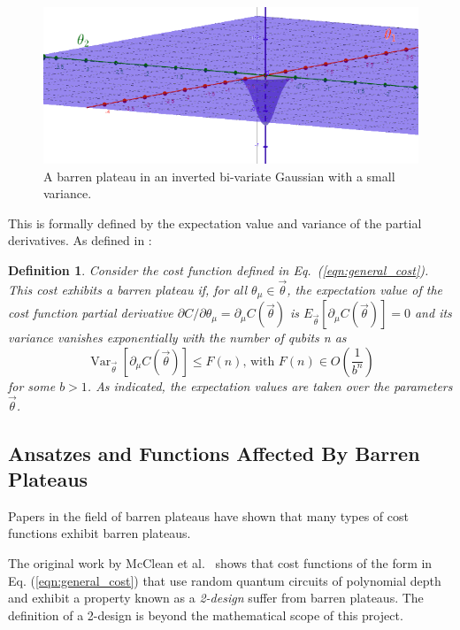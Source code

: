 \documentclass[a4paper,12pt]{article}
\newcommand{\thetas}{\vec{\theta}}
\newcommand{\del}{\partial}
\DeclareMathOperator{\Var}{Var}
\newtheorem{definition}{Definition}
\begin{document}
\begin{figure}[h]
    \centering
    \captionsetup{justification=centering, margin=0.5cm}
    \includegraphics[scale=0.5]{bp_3d.png}
    \caption{A barren plateau in an inverted bi-variate Gaussian with a small variance.}
    \label{fig:bp}
\end{figure}

This is formally defined by the expectation value and variance of the partial derivatives.
As defined in \cite{arrasmith_effect_2021}:

\begin{definition} \label{def:bp}
    Consider the cost function defined in Eq.~(\ref{eqn:general_cost}). This cost exhibits a barren plateau if, for all $\theta_\mu \in \thetas$, the expectation value of the cost function partial derivative
    $\del C / \del\theta_\mu = \del_\mu C(\thetas)$
    is
    $E_{\thetas}[\del_\mu C(\thetas)] = 0$
    and its variance vanishes exponentially with the number of qubits n as 
    \begin{equation} \label{eqn:vanishing}
        \Var_{\thetas}[\del_\mu C(\thetas)] \leq F(n) \textrm{,   with   }F(n) \in O\left(\frac{1}{b^n}\right)
    \end{equation}
    for some $b > 1$. As indicated, the expectation values are taken over the parameters $\thetas$.
\end{definition}

\subsection{Ansatzes and Functions Affected By Barren Plateaus}
Papers in the field of barren plateaus have shown that many types of cost functions exhibit barren plateaus.

The original work by McClean et al.~\cite{mcclean_barren_2018} shows that cost functions of the form in Eq. (\ref{eqn:general_cost}) that use random quantum circuits of polynomial depth and exhibit a property known as a \emph{2-design} suffer from barren plateaus.
The definition of a 2-design is beyond the mathematical scope of this project.
\end{document}
